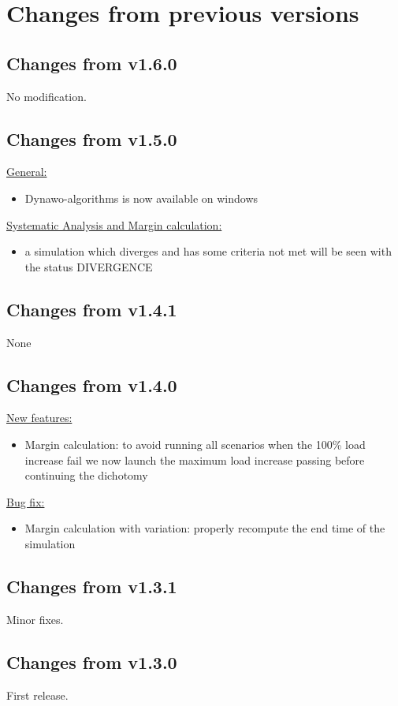\documentclass[a4paper, 12pt]{report}
\begin{document}
\section{Changes from previous versions}

\subsection{Changes from v1.6.0}
No modification.

\subsection{Changes from v1.5.0}
\underline{General:}

\begin{itemize}
\item Dynawo-algorithms is now available on windows
\end{itemize}

\underline{Systematic Analysis and Margin calculation:}

\begin{itemize}
\item a simulation which diverges and has some criteria not met will be seen with the status DIVERGENCE
\end{itemize}

\subsection{Changes from v1.4.1}
None

\subsection{Changes from v1.4.0}

\underline{New features:}
\begin{itemize}
\item Margin calculation: to avoid running all scenarios when the 100\% load increase fail we now launch the maximum load increase passing before continuing the dichotomy
\end{itemize}

\underline{Bug fix:}
\begin{itemize}
\item Margin calculation with variation: properly recompute the end time of the simulation
\end{itemize}

\subsection{Changes from v1.3.1}
Minor fixes.

\subsection{Changes from v1.3.0}
First release.
\end{document}
